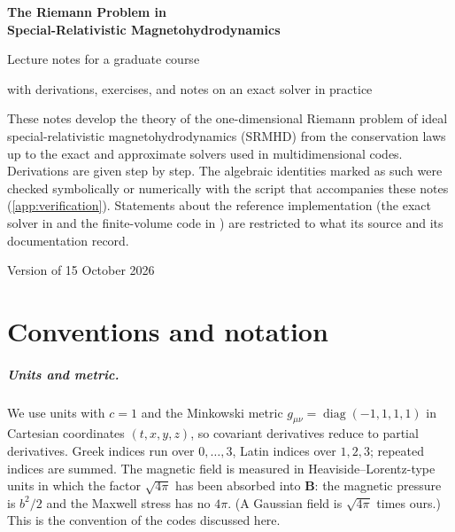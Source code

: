 \documentclass[11pt,a4paper,oneside,openany]{book}
\theoremstyle{definition}
\theoremstyle{plain}
\theoremstyle{remark}
\newcommand{\BB}{\bm{B}}
\newcommand{\file}[1]{\texttt{\detokenize{#1}}}
\begin{document}
\begin{titlepage}
\centering
\vspace*{3cm}
{\Huge\bfseries The Riemann Problem in\\[0.3em] Special-Relativistic Magnetohydrodynamics\par}
\vspace{1.2cm}
{\Large Lecture notes for a graduate course\par}
\vspace{0.6cm}
{\large with derivations, exercises, and notes on an exact solver in practice\par}
\vspace{2.5cm}
\begin{minipage}{0.82\textwidth}
\small
These notes develop the theory of the one-dimensional Riemann problem of ideal
special-relativistic magnetohydrodynamics (SRMHD) from the conservation laws up to
the exact and approximate solvers used in multidimensional codes. Derivations are
given step by step. The algebraic identities marked as such were checked
symbolically or numerically with the script \file{sympy_checks.py} that accompanies
these notes (\cref{app:verification}). Statements about the reference
implementation (the exact solver in \file{rmhd_final} and the finite-volume code in
\file{HLLD}) are restricted to what its source and its documentation record.
\end{minipage}
\vfill
{\small Version of 15 October 2026\par}
\end{titlepage}

\frontmatter
\tableofcontents

\chapter*{Conventions and notation}

\paragraph{Units and metric.} We use units with $c=1$ and the Minkowski metric
$g_{\mu\nu}=\operatorname{diag}(-1,1,1,1)$ in Cartesian coordinates $(t,x,y,z)$, so
covariant derivatives reduce to partial derivatives. Greek indices run over
$0,\dots,3$, Latin indices over $1,2,3$; repeated indices are summed. The magnetic field
is measured in Heaviside--Lorentz-type units in which the factor $\sqrt{4\pi}$ has been
absorbed into $\BB$: the magnetic pressure is $b^2/2$ and the Maxwell stress has no
$4\pi$. (A Gaussian field is $\sqrt{4\pi}$ times ours.) This is the convention of the
codes discussed here.
\end{document}
